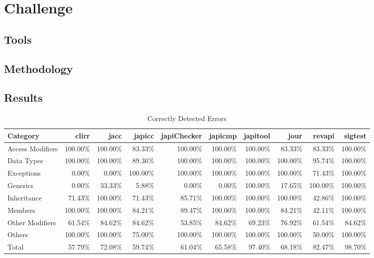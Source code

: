 \documentclass[conference]{IEEEtran}
\begin{document}
\section{Challenge}

\subsection{Tools}

\subsection{Methodology}

\subsection{Results}

\begin{table*}[t]
  \centering
  \begin{tabular}{l | r r r r r r r r r }
Category   &  clirr   &  jacc   &  japicc   &  japiChecker   &  japicmp   &  japitool   &  jour   &  revapi   &  sigtest  \\
\hline
Access Modifiers   &  100.00\%   &  100.00\%   &  83.33\%   &  100.00\%   &  100.00\%   &  100.00\%   &  83.33\%   &  83.33\%   &  100.00\% \\
Data Types   &  100.00\%   &  100.00\%   &  89.36\%   &  100.00\%   &  100.00\%   &  100.00\%   &  100.00\%   &  95.74\%   &  100.00\%  \\
Exceptions   &  0.00\%   &  0.00\%   &  100.00\%   &  100.00\%   &  100.00\%   &  100.00\%   &  100.00\%   &  71.43\%   &  100.00\%  \\
Generics   &  0.00\%   &  33.33\%   &  5.88\%   &  0.00\%   &  0.00\%   &  100.00\%   &  17.65\%   &  100.00\%   &  100.00\%  \\
Inheritance   &  71.43\%   &  100.00\%   &  71.43\%   &  85.71\%   &  100.00\%   &  100.00\%   &  100.00\%   &  42.86\%   &  100.00\%  \\
Members   &  100.00\%   &  100.00\%   &  84.21\%   &  89.47\%   &  100.00\%   &  100.00\%   &  84.21\%   &  42.11\%   &  100.00\%  \\
Other Modifiers   &  61.54\%   &  84.62\%   &  84.62\%   &  53.85\%   &  84.62\%   &  69.23\%   &  76.92\%   &  61.54\%   &  84.62\%  \\
Others   &  100.00\%   &  100.00\%   &  75.00\%   &  100.00\%   &  100.00\%   &  100.00\%   &  100.00\%   &  50.00\%   &  100.00\%  \\
\hline
Total  &  57.79\%   &  72.08\%   &  59.74\%   &  61.04\%   &  65.58\%   &  97.40\%   &  68.18\%   &  82.47\%   &  98.70\%  \\  \end{tabular}
  \caption{Correctly Detected Errors}
  \label{tab:result}
\end{table*}
\end{document}
